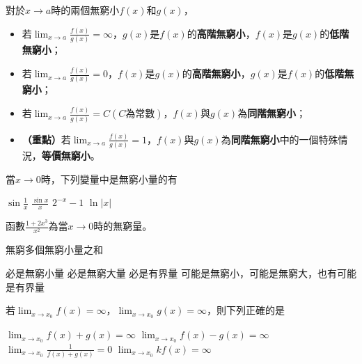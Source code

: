 \documentclass[12pt, addpoints]{exam}
\def \important{\textbf{（重點）}}
\begin{document}
\begin{questions}

\question
對於$x \to a$時的兩個無窮小$f(x)$和$g(x)$，\begin{itemize}
    \item 若$\displaystyle \lim_{x \to a} \frac{f(x)}{g(x)}=\infty$，$g(x)$是$f(x)$的\textbf{高階無窮小}，$f(x)$是$g(x)$的\textbf{低階無窮小}；
    \item 若$\displaystyle \lim_{x \to a} \frac{f(x)}{g(x)}=0$，$f(x)$是$g(x)$的\textbf{高階無窮小}，$g(x)$是$f(x)$的\textbf{低階無窮小}；
    \item 若$\displaystyle \lim_{x \to a} \frac{f(x)}{g(x)}=C(C\text{為常數})$，$f(x)$與$g(x)$為\textbf{同階無窮小}；
    \item \important 若$\displaystyle \lim_{x \to a} \frac{f(x)}{g(x)}=1$，$f(x)$與$g(x)$為\textbf{同階無窮小}中的一個特殊情況，\textbf{等價無窮小}。
\end{itemize}

\question[1]
當$x \to 0$時，下列變量中是無窮小量的有
\begin{choices}
    \choice $\displaystyle \sin{\frac{1}{x}}$
    \choice $\displaystyle \frac{\sin{x}}{x}$
    \choice $2^{-x}-1$
    \choice $\ln{|x|}$
\end{choices}

\question[1]
函數$\displaystyle \frac{1+2x^3}{x^2}$為當$x \to 0$時的無窮\fillin[Black]量。

\newpage %

\question[1]
無窮多個無窮小量之和
\begin{choices}
    \choice 必是無窮小量
    \choice 必是無窮大量
    \choice 必是有界量
    \choice 可能是無窮小，可能是無窮大，也有可能是有界量
\end{choices}

\question[1]
若$\displaystyle \lim_{x \to x_0}f(x)=\infty$，$\displaystyle \lim_{x \to x_0}g(x)=\infty$，則下列正確的是
\begin{choices}
    \choice $\displaystyle \lim_{x \to x_0}f(x)+g(x)=\infty$
    \choice $\displaystyle \lim_{x \to x_0}f(x)-g(x)=\infty$
    \choice $\displaystyle \lim_{x \to x_0}\frac{1}{f(x)+g(x)}=0$
    \choice $\displaystyle \lim_{x \to x_0}kf(x)=\infty$
\end{choices}


\end{questions}
\end{document}
